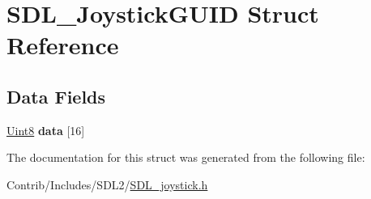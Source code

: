\hypertarget{struct_s_d_l___joystick_g_u_i_d}{}\section{S\+D\+L\+\_\+\+Joystick\+G\+U\+ID Struct Reference}
\label{struct_s_d_l___joystick_g_u_i_d}
\subsection*{Data Fields}
\begin{DoxyCompactItemize}
\item 
\hyperlink{_s_d_l__stdinc_8h_a2944638813a090aa23e62f4da842c3e2}{Uint8} {\bfseries data} \mbox{[}16\mbox{]}\hypertarget{struct_s_d_l___joystick_g_u_i_d_a579f6b5bb5c13d1007beee0f034b8a96}{}\label{struct_s_d_l___joystick_g_u_i_d_a579f6b5bb5c13d1007beee0f034b8a96}

\end{DoxyCompactItemize}


The documentation for this struct was generated from the following file\+:\begin{DoxyCompactItemize}
\item 
Contrib/\+Includes/\+S\+D\+L2/\hyperlink{_s_d_l__joystick_8h}{S\+D\+L\+\_\+joystick.\+h}\end{DoxyCompactItemize}
